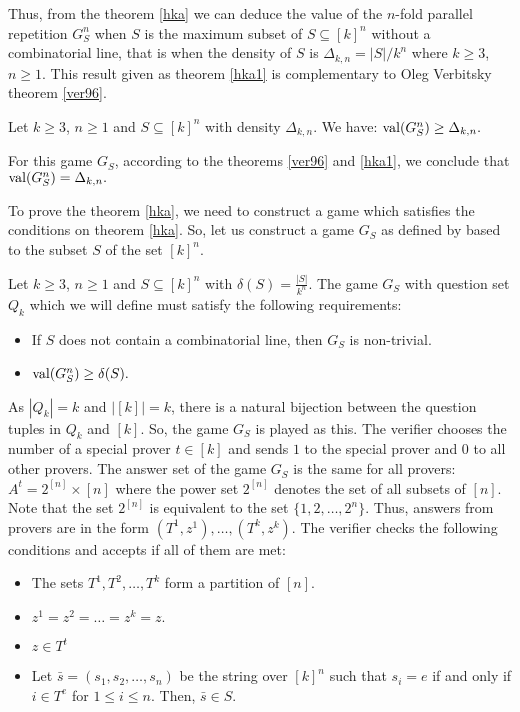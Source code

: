 Thus, from the theorem \eqref{hka} we can deduce the value of the $n$-fold parallel repetition $G_S^n$ when $S$ is the maximum subset of  $S\subseteq [k]^n$ without a combinatorial line, that is when the density of $S$ is $\Delta_{k,n}= |S|/k^n$ where $k\geq 3$, $n\geq 1$. This result given as theorem \eqref{hka1} is complementary to  Oleg Verbitsky theorem \eqref{ver96}.

 \begin{thm} Let $k\geq 3$, $n\geq 1$ and $S\subseteq [k]^n$ with density $\Delta_{k,n}$. We have: 	
 $\mathrm{val} (G_S^n) \geq \Delta_{k,n}.$  \label{hka1}
 	\end{thm} 
For this  game $G_S$, according to the theorems \eqref{ver96} and \eqref{hka1}, we conclude that $\mathrm{val} (G_S^n)=\Delta_{k,n}.$

To prove  the theorem \eqref{hka}, we need to construct a game which  satisfies the conditions on theorem \eqref{hka}. So, let us construct a game $G_S$   as  defined by \cite*{hkazla2016forbidden}
based to the subset $S $ of the set $[k]^n$. 

Let $k \geq 3$, $n \geq 1$ and $S \subseteq [k]^n$ with $\delta (S)= \frac{|S|}{k^n}$. The game $G_S$ with question set $Q_k$ which we will define must satisfy the  following requirements: 
\begin{itemize}
\item If $S$ does not contain a combinatorial line, then $G_S$ is non-trivial. \item $\mathrm{val} (G_S^n) \geq \delta (S).$
\end{itemize}

As $|Q_k|=k$ and $|[k]|=k$, there is a natural bijection between the question tuples in $Q_k$ and $[k]$. So, the game $G_S$ is played as this. The verifier chooses the number of a special prover $t \in [k]$   and sends $1$ to the special prover and $0$ to all other provers. 
The answer set of the game $G_S$ is the same for all provers: $A^t=2^{[n]} \times [n]$ where the power set  $2^{[n]}$ denotes the set of all subsets of $[n]$. Note that the set $2^{[n]}$ is equivalent to the set $\{1,2,\ldots, 2^n\}.$ Thus, answers from provers are in the form $(T^1, z^1), \ldots, (T^k, z^k)$. The verifier checks the following conditions and accepts if all of them are met: 
\begin{itemize}
\item The sets $T^1, T^2,\ldots, T^k$ form a partition of $[n].$
\item $z^1=z^2=\ldots=z^k=z.$
\item $z \in T^t$
\item Let $\bar{s} = (s_1, s_2, \ldots, s_n)$ be the string over $[k]^n$ such that  $s_i = e$ if and only if $i \in  T ^e$ for $1\leq i \leq n.$ Then, $\bar{s} \in S.$
\end{itemize}

